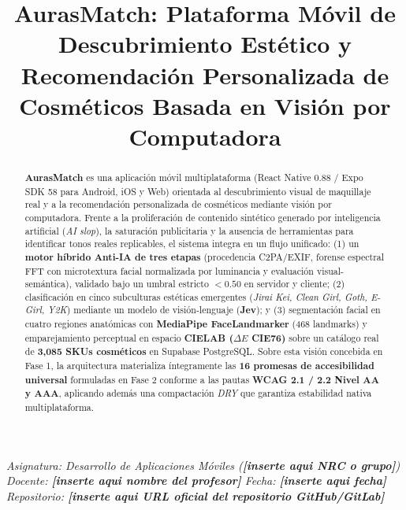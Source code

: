 \documentclass[conference]{IEEEtran}
\begin{document}
\title{AurasMatch: Plataforma Móvil de Descubrimiento Estético y Recomendación Personalizada de Cosméticos Basada en Visión por Computadora}

\author{
\and
{}
}

\maketitle

\begin{center}
\small\textit{Asignatura: Desarrollo de Aplicaciones Móviles (\textbf{[inserte aqui NRC o grupo]}) \textbar{} Docente: \textbf{[inserte aqui nombre del profesor]} \textbar{} Fecha: \textbf{[inserte aqui fecha]} \\
Repositorio: \textbf{[inserte aqui URL oficial del repositorio GitHub/GitLab]}}
\end{center}

\begin{abstract}
\textbf{AurasMatch} es una aplicación móvil multiplataforma (React Native 0.88 / Expo SDK 58 para Android, iOS y Web) orientada al descubrimiento visual de maquillaje real y a la recomendación personalizada de cosméticos mediante visión por computadora. Frente a la proliferación de contenido sintético generado por inteligencia artificial (\textit{AI slop}), la saturación publicitaria y la ausencia de herramientas para identificar tonos reales replicables, el sistema integra en un flujo unificado: (1) un \textbf{motor híbrido Anti-IA de tres etapas} (procedencia C2PA/EXIF, forense espectral FFT con microtextura facial normalizada por luminancia y evaluación visual-semántica), validado bajo un umbral estricto $< 0.50$ en servidor y cliente; (2) clasificación en cinco subculturas estéticas emergentes (\textit{Jirai Kei, Clean Girl, Goth, E-Girl, Y2K}) mediante un modelo de visión-lenguaje (\textbf{Jev}); y (3) segmentación facial en cuatro regiones anatómicas con \textbf{MediaPipe FaceLandmarker} (468 landmarks) y emparejamiento perceptual en espacio \textbf{CIELAB ($\Delta E$ CIE76)} sobre un catálogo real de \textbf{3,085 SKUs cosméticos} en Supabase PostgreSQL. Sobre esta visión concebida en Fase 1, la arquitectura materializa íntegramente las \textbf{16 promesas de accesibilidad universal} formuladas en Fase 2 conforme a las pautas \textbf{WCAG 2.1 / 2.2 Nivel AA y AAA}, aplicando además una compactación \textit{DRY} que garantiza estabilidad nativa multiplataforma.
\end{abstract}
\end{document}
